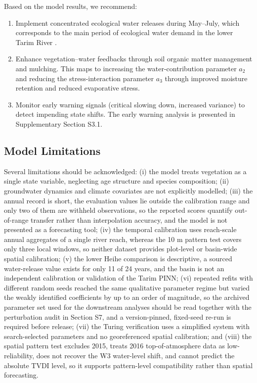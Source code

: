 \documentclass[preprint,review,12pt,3p]{elsarticle}
\begin{document}
	Based on the model results, we recommend:
	\begin{enumerate}
		\item Implement concentrated ecological water releases during May--July, which corresponds to the main period of ecological water demand in the lower Tarim River \citep{ye2010ecological}.
		\item Enhance vegetation--water feedbacks through soil organic matter management and mulching. This maps to increasing the water-contribution parameter \(a_2\) and reducing the stress-interaction parameter \(a_3\) through improved moisture retention and reduced evaporative stress.
		\item Monitor early warning signals (critical slowing down, increased variance) to detect impending state shifts. The early warning analysis is presented in Supplementary Section S3.1.
	\end{enumerate}
	
	\subsection{Model Limitations}
	
Several limitations should be acknowledged: (i) the model treats vegetation as a single state variable, neglecting age structure and species composition; (ii) groundwater dynamics and climate covariates are not explicitly modelled; (iii) the annual record is short, the evaluation values lie outside the calibration range and only two of them are withheld observations, so the reported scores quantify out-of-range transfer rather than interpolation accuracy, and the model is not presented as a forecasting tool; (iv) the temporal calibration uses reach-scale annual aggregates of a single river reach, whereas the 10 m pattern test covers only three local windows, so neither dataset provides plot-level or basin-wide spatial calibration; (v) the lower Heihe comparison is descriptive, a sourced water-release value exists for only 11 of 24 years, and the basin is not an independent calibration or validation of the Tarim PINN; (vi) repeated refits with different random seeds reached the same qualitative parameter regime but varied the weakly identified coefficients by up to an order of magnitude, so the archived parameter set used for the downstream analyses should be read together with the perturbation audit in Section S7, and a version-pinned, fixed-seed re-run is required before release; (vii) the Turing verification uses a simplified system with search-selected parameters and no georeferenced spatial calibration; and (viii) the spatial pattern test excludes 2015, treats 2016 top-of-atmosphere data as low-reliability, does not recover the W3 water-level shift, and cannot predict the absolute TVDI level, so it supports pattern-level compatibility rather than spatial forecasting.
	
\end{document}
